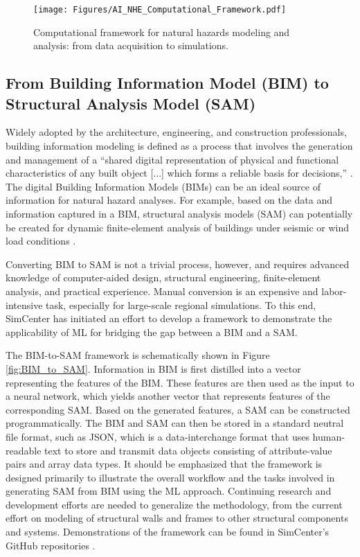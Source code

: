 \begin{figure}[htb]
    \centering
    \texttt{[image: Figures/AI\_NHE\_Computational\_Framework.pdf]}
    \caption{Computational framework for natural hazards modeling and analysis: from data acquisition to simulations.}
    \label{fig:AI_NHE_Computational_Framework}
\end{figure}

\subsection{From Building Information Model (BIM) to Structural Analysis Model (SAM)}

Widely adopted by the architecture, engineering, and construction professionals, building information modeling is defined as a process that involves the generation and management of a ``shared digital representation of physical and functional characteristics of any built object [...] which forms a reliable basis for decisions,'' \citep{iso2016building}. The digital Building Information Models (BIMs) can be an ideal source of information for natural hazard analyses. For example, based on the data and information captured in a BIM, structural analysis models (SAM) can potentially be created for dynamic finite-element analysis of buildings under seismic or wind load conditions \citep{lu2020cimpowered}. 

Converting BIM to SAM is not a trivial process, however, and requires advanced knowledge of computer-aided design, structural engineering, finite-element analysis, and practical experience. Manual conversion is an expensive and labor-intensive task, especially for large-scale regional simulations. To this end, SimCenter has initiated an effort to develop a framework to demonstrate the applicability of ML for bridging the gap between a BIM and a SAM.

The BIM-to-SAM framework is schematically shown in Figure \ref{fig:BIM_to_SAM}. Information in BIM is first distilled into a vector representing the features of the BIM. These features are then used as the input to a neural network, which yields another vector that represents features of the corresponding SAM. Based on the generated features, a SAM can be constructed programmatically. The BIM and SAM can then be stored in a standard neutral file format, such as JSON, which is a data-interchange format that uses human-readable text to store and transmit data objects consisting of attribute-value pairs and array data types. It should be emphasized that the framework is designed primarily to illustrate the overall workflow and the tasks involved in generating SAM from BIM using the ML approach. Continuing research and development efforts are needed to generalize the methodology, from the current effort on modeling of structural walls and frames to other structural components and systems. Demonstrations of the framework can be found in SimCenter's GitHub repositories \citep{wang2019bim2sam, wang2019swim}.

